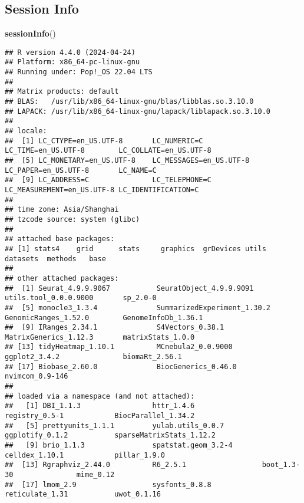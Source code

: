 \documentclass[
]{article}
\newenvironment{Shaded}{\begin{snugshade}}{\end{snugshade}}
\newcommand{\KeywordTok}[1]{\textcolor[rgb]{0.13,0.29,0.53}{\textbf{#1}}}
\newcommand{\NormalTok}[1]{#1}
\begin{document}
\hypertarget{session}{%
\subsection{Session Info}\label{session}}

\begin{Shaded}
\begin{Highlighting}[]
\KeywordTok{sessionInfo}\NormalTok{()}
\end{Highlighting}
\end{Shaded}

\begin{verbatim}
## R version 4.4.0 (2024-04-24)
## Platform: x86_64-pc-linux-gnu
## Running under: Pop!_OS 22.04 LTS
## 
## Matrix products: default
## BLAS:   /usr/lib/x86_64-linux-gnu/blas/libblas.so.3.10.0 
## LAPACK: /usr/lib/x86_64-linux-gnu/lapack/liblapack.so.3.10.0
## 
## locale:
##  [1] LC_CTYPE=en_US.UTF-8       LC_NUMERIC=C               LC_TIME=en_US.UTF-8        LC_COLLATE=en_US.UTF-8    
##  [5] LC_MONETARY=en_US.UTF-8    LC_MESSAGES=en_US.UTF-8    LC_PAPER=en_US.UTF-8       LC_NAME=C                 
##  [9] LC_ADDRESS=C               LC_TELEPHONE=C             LC_MEASUREMENT=en_US.UTF-8 LC_IDENTIFICATION=C       
## 
## time zone: Asia/Shanghai
## tzcode source: system (glibc)
## 
## attached base packages:
## [1] stats4    grid      stats     graphics  grDevices utils     datasets  methods   base     
## 
## other attached packages:
##  [1] Seurat_4.9.9.9067           SeuratObject_4.9.9.9091     utils.tool_0.0.0.9000       sp_2.0-0                   
##  [5] monocle3_1.3.4              SummarizedExperiment_1.30.2 GenomicRanges_1.52.0        GenomeInfoDb_1.36.1        
##  [9] IRanges_2.34.1              S4Vectors_0.38.1            MatrixGenerics_1.12.3       matrixStats_1.0.0          
## [13] tidyHeatmap_1.10.1          MCnebula2_0.0.9000          ggplot2_3.4.2               biomaRt_2.56.1             
## [17] Biobase_2.60.0              BiocGenerics_0.46.0         nvimcom_0.9-146            
## 
## loaded via a namespace (and not attached):
##   [1] DBI_1.1.3                 httr_1.4.6                registry_0.5-1            BiocParallel_1.34.2      
##   [5] prettyunits_1.1.1         yulab.utils_0.0.7         ggplotify_0.1.2           sparseMatrixStats_1.12.2 
##   [9] brio_1.1.3                spatstat.geom_3.2-4       celldex_1.10.1            pillar_1.9.0             
##  [13] Rgraphviz_2.44.0          R6_2.5.1                  boot_1.3-30               mime_0.12                
##  [17] lmom_2.9                  sysfonts_0.8.8            reticulate_1.31           uwot_0.1.16              

\end{verbatim}
\end{document}
